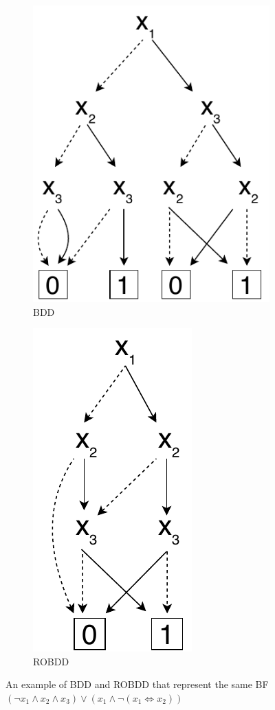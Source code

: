 \documentclass[
  digital, %
  color,
  twoside, %
  table,   %
  nolof,     %
  nolot,     %
]{fithesis3}
\theoremstyle{definition}
\theoremstyle{remark}
\newcommand{\lequal}{\Leftrightarrow}
\begin{document}
\begin{figure}[ht]
    \centering
    \begin{subfigure}[b]{.5\linewidth}
        \centering
        \includegraphics{figures/bdd1.pdf}
        \caption{BDD}
        \label{fig:BDD}
    \end{subfigure}%
    \begin{subfigure}[b]{.5\linewidth}
        \centering
        \includegraphics{figures/bdd2.pdf}
        \caption{ROBDD}
        \label{fig:ROBDD}
    \end{subfigure}
    \caption{An example of BDD and ROBDD that represent the same BF $(\neg x_1 \land x_2 \land x_3) \lor (x_1 \land \neg (x_1 \lequal x_2))$}
    \label{fig:BDDandROBDD}
\end{figure}
\end{document}

